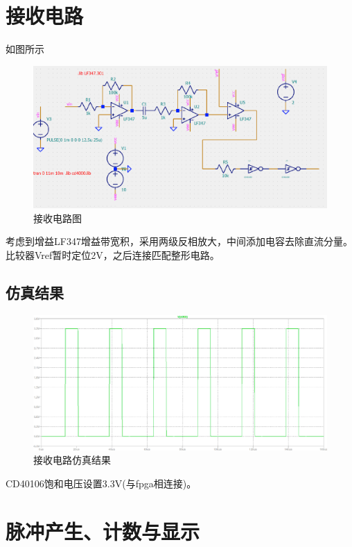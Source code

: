 \documentclass{article}
\begin{document}
\section{接收电路}
如图所示
\begin{figure}[H]
    \centering
    \includegraphics[width = 12cm]{images/rx_cir.png}
    \caption{接收电路图}\label{fig3}
\end{figure}
考虑到增益LF347增益带宽积，采用两级反相放大，中间添加电容去除直流分量。比较器Vref暂时定位2V，之后连接匹配整形电路。
\subsection{仿真结果}
\begin{figure}[H]
    \centering
    \includegraphics[width = 12cm]{images/rx_waveform.png}
    \caption{接收电路仿真结果}\label{fig4}
\end{figure}
CD40106饱和电压设置3.3V(与fpga相连接)。

\section{脉冲产生、计数与显示}

\end{document}
